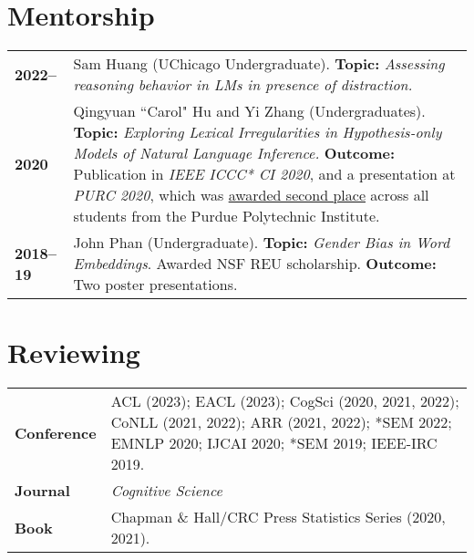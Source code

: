 \documentclass[11pt]{article}
\begin{document}




\renewcommand*{\arraystretch}{1.5}

\section*{Mentorship}
\vspace{-1em}
\begin{longtable}{p{}  p{} }
    \textbf{2022--} & Sam Huang (UChicago Undergraduate). \textbf{Topic:} \textit{Assessing reasoning behavior in LMs in presence of distraction.}\\
    \textbf{2020} & Qingyuan ``Carol" Hu and Yi Zhang (Undergraduates). \textbf{Topic:} \textit{Exploring Lexical Irregularities in Hypothesis-only Models of Natural Language Inference.} \textbf{Outcome:} Publication in \textit{IEEE ICCC* CI 2020}, and a presentation at \textit{PURC 2020}, which was \underline{awarded second place} across all students from the Purdue Polytechnic Institute.\\
    \textbf{2018--19} & John Phan (Undergraduate). \textbf{Topic:} \textit{Gender Bias in Word Embeddings}. Awarded NSF REU scholarship. \textbf{Outcome:} Two poster presentations.
\end{longtable}

\section*{Reviewing}
\vspace{-1em}
\begin{longtable}{p{}  p{} }
    \textbf{Conference} & ACL (2023); EACL (2023); CogSci (2020, 2021, 2022); CoNLL (2021, 2022); ARR (2021, 2022); *SEM 2022; EMNLP 2020; IJCAI 2020; *SEM 2019; IEEE-IRC 2019.\\
    \textbf{Journal} & \textit{Cognitive Science}\\
    \textbf{Book} & Chapman \& Hall/CRC Press Statistics Series (2020, 2021).
\end{longtable}
\end{document}
